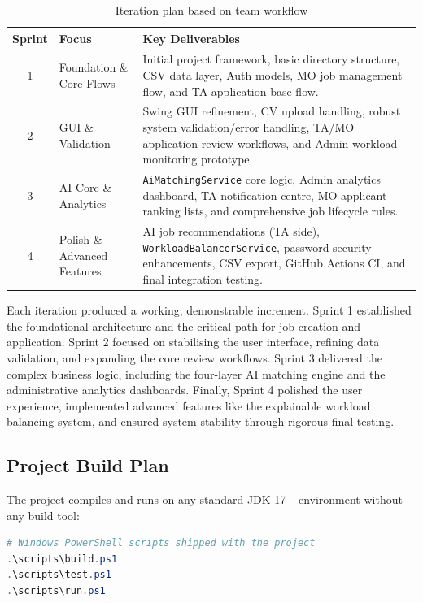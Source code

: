 \documentclass[12pt, a4paper]{article}
\begin{document}
\begin{table}[H]
\centering
\renewcommand{\arraystretch}{1.3}
\begin{tabular}{|c|p{3.5cm}|p{9.5cm}|}
\hline
\textbf{Sprint} & \textbf{Focus} & \textbf{Key Deliverables} \\ \hline
1 & Foundation \& Core Flows & Initial project framework, basic directory structure, CSV data layer, Auth models, MO job management flow, and TA application base flow. \\ \hline
2 & GUI \& Validation & Swing GUI refinement, CV upload handling, robust system validation/error handling, TA/MO application review workflows, and Admin workload monitoring prototype. \\ \hline
3 & AI Core \& Analytics & \texttt{AiMatchingService} core logic, Admin analytics dashboard, TA notification centre, MO applicant ranking lists, and comprehensive job lifecycle rules. \\ \hline
4 & Polish \& Advanced Features & AI job recommendations (TA side), \texttt{WorkloadBalancerService}, password security enhancements, CSV export, GitHub Actions CI, and final integration testing. \\ \hline
\end{tabular}
\caption{Iteration plan based on team workflow}
\end{table}

Each iteration produced a working, demonstrable increment. Sprint 1 established the foundational architecture and the critical path for job creation and application. Sprint 2 focused on stabilising the user interface, refining data validation, and expanding the core review workflows. Sprint 3 delivered the complex business logic, including the four-layer AI matching engine and the administrative analytics dashboards. Finally, Sprint 4 polished the user experience, implemented advanced features like the explainable workload balancing system, and ensured system stability through rigorous final testing.

\subsection{Project Build Plan}
The project compiles and runs on any standard JDK 17+ environment without any build tool:

\begin{lstlisting}[language=powershell, caption=Build and run commands]
# Windows PowerShell scripts shipped with the project
.\scripts\build.ps1
.\scripts\test.ps1
.\scripts\run.ps1
\end{lstlisting}
\end{document}
